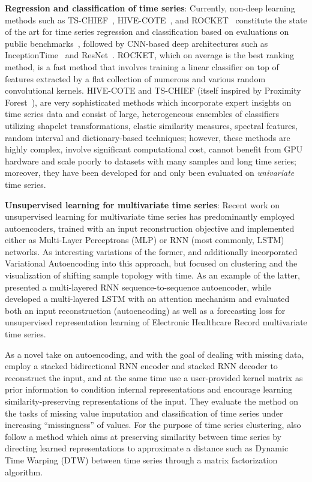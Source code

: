 \documentclass{article} \usepackage{iclr2021_conference,times}
\begin{document}
\textbf{Regression and classification of time series}:
Currently, non-deep learning methods such as TS-CHIEF~\citep{ts-chief_2020}, HIVE-COTE~\citep{hive_cote_2018}, and ROCKET~\citep{rocket_2020} constitute the state of the art for time series regression and classification based on evaluations on public benchmarks~\citep{regression_monash_2020, classification_archive}, followed by CNN-based deep architectures such as InceptionTime~\citep{inceptiontime_2019} and ResNet~\citep{ismail_fawaz_deep_review2019}. ROCKET, which on average is the best ranking method, is a fast method that involves training a linear classifier on top of features extracted by a flat collection of numerous and various random convolutional kernels. HIVE-COTE and TS-CHIEF (itself inspired by Proximity Forest~\citep{proximity_forest_2019}), are very sophisticated methods which incorporate expert insights on time series data and consist of large, heterogeneous ensembles of classifiers utilizing shapelet transformations, elastic similarity measures, spectral features, random interval and dictionary-based techniques; however, these methods are highly complex, involve significant computational cost, cannot benefit from GPU hardware and scale poorly to datasets with many samples and long time series; moreover, they have been developed for and only been evaluated on \textit{univariate} time series.

\textbf{Unsupervised learning for multivariate time series}:
Recent work on unsupervised learning for multivariate time series has predominantly employed autoencoders, trained with an input reconstruction objective and implemented either as Multi-Layer Perceptrons (MLP) or RNN (most commonly, LSTM) networks. As interesting variations of the former, \citet{kopf_mixture--experts_2019} and \citet{fortuin_som-vae_2019} additionally incorporated Variational Autoencoding into this approach, but focused on clustering and the visualization of shifting sample topology with time. As an example of the latter, \citet{malhotra_timenet_2017} presented a multi-layered RNN sequence-to-sequence autoencoder, while \citet{lyu_improving_2018} developed a multi-layered LSTM with an attention mechanism and evaluated both an input reconstruction (autoencoding) as well as a forecasting loss for unsupervised representation learning of Electronic Healthcare Record multivariate time series.

As a novel take on autoencoding, and with the goal of dealing with missing data, \citet{bianchi_learning_2019} employ a stacked bidirectional RNN encoder and stacked RNN decoder to reconstruct the input, and at the same time use a user-provided kernel matrix as prior information to condition internal representations and encourage learning similarity-preserving representations of the input. They evaluate the method on the tasks of missing value imputation and classification of time series under increasing ``missingness'' of values.
For the purpose of time series clustering, \citet{lei_similarity_2017} also follow a method which aims at preserving similarity between time series by directing learned representations to approximate a distance such as Dynamic Time Warping (DTW) between time series through a matrix factorization algorithm. 
\end{document}
